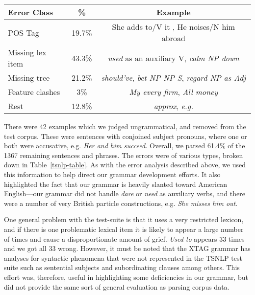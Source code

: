 \begin{table*}[htb]
\centering
\begin{tabular}{|l|c|c|}
\hline
Error Class & \% & Example \\ \hline
POS Tag &  19.7\% & She adds  to/V it , He noises/N him abroad \\ \hline
Missing lex item & 43.3\% & {\it used} as an auxiliary V, {\it calm NP down} \\ \hline
Missing tree & 21.2\% & {\it should've}, {\it bet NP NP S}, {\it
regard NP as Adj} \\ \hline
Feature clashes & 3\% & {\it My every firm}, {\it All money} \\ \hline
Rest&12.8\% & {\it approx}, {\it e.g.} \\
\hline
\end{tabular}
\caption{Breakdown of TSNLP Errors}
\label{tsnlp-table}
\end{table*} 

There were 42 examples which we judged ungrammatical, and removed from
the test corpus. These were sentences with conjoined subject pronouns,
where one or both were accusative, e.g. {\it Her and him succeed.}
Overall, we parsed 61.4\% of the 1367 remaining sentences and
phrases. The errors were of various types, broken down in
Table~\ref{tsnlp-table}. As with the error analysis described above,
we used this information to help direct our grammar development
efforts. It also highlighted the fact
that our grammar is heavily slanted toward American English---our
grammar did not handle {\it dare} or {\it need} as auxiliary verbs,
and there were a number of very British particle constructions,
e.g. {\it She misses him out}. 

One general problem with the test-suite is that it uses a very
restricted lexicon, and if there is one problematic lexical item it is
likely to appear a large number of times and cause a disproportionate
amount of grief. {\it Used to} appears 33 times and we got all 33
wrong. However, it must be noted that the XTAG grammar has analyses
for syntactic phenomena that were not represented in the TSNLP test
suite such as sentential subjects and subordinating clauses among
others. This effort was, therefore, useful in highlighting some
deficiencies in our grammar, but did not provide the same sort of
general evaluation as parsing corpus data.

